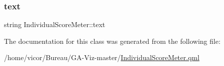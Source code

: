 \mbox{\label{class_individual_score_meter_a7a06808ecac8297492f2d5e58f60d400}} 
\subsubsection{\texorpdfstring{text}{text}}
{\footnotesize\ttfamily string Individual\+Score\+Meter\+::text}



The documentation for this class was generated from the following file\+:\begin{DoxyCompactItemize}
\item 
/home/vicor/\+Bureau/\+G\+A-\/\+Viz-\/master/\hyperlink{_individual_score_meter_8qml}{Individual\+Score\+Meter.\+qml}\end{DoxyCompactItemize}
